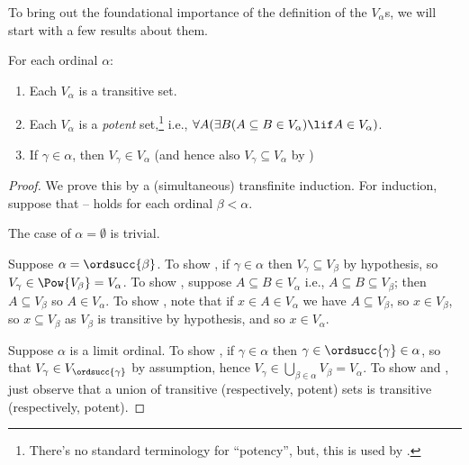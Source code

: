 \documentclass[../../../include/open-logic-section]{subfiles}
\begin{document}

To bring out the foundational importance of the definition of the
$V_\alpha$s, we will start with a few results about them.

\begin{lem}
For each ordinal $\alpha$:
\begin{enumerate}
	\item{} Each $V_\alpha$ is a transitive set.
	\item{} Each $V_\alpha$ is a
	\emph{potent} set,\footnote{There's no standard terminology for
	``potency'', but, this is used by  \citealt{ButtonLT1}.} i.e., $\forall A(\exists
	B(A \subseteq B \in V_\alpha) \lif A \in V_\alpha)$.
	\item{} If $\gamma \in \alpha$, then $V_\gamma
	\in V_\alpha$ (and hence also $V_\gamma \subseteq V_\alpha$ by
	)
\end{enumerate}
\end{lem}

\begin{proof}
We prove this by a (simultaneous) transfinite induction.  For
induction, suppose that -- holds
for each ordinal $\beta < \alpha$. 

The case of $\alpha = \emptyset$ is trivial. 

Suppose $\alpha = \ordsucc{\beta}$. To show , if
$\gamma \in \alpha$ then $V_\gamma \subseteq V_\beta$ by hypothesis,
so $V_\gamma \in \Pow{V_\beta} = V_\alpha$. To show
, suppose $A \subseteq B \in V_\alpha$ i.e., $A
\subseteq B \subseteq V_\beta$; then $A \subseteq V_\beta$ so $A \in
V_\alpha$. To show , note that if $x \in A \in
V_\alpha$ we have $A \subseteq V_\beta$, so $x \in V_\beta$, so $x
\subseteq V_\beta$ as $V_\beta$ is transitive by hypothesis, and so $x
\in V_\alpha$. 

Suppose $\alpha$ is  a limit ordinal. To show , if
$\gamma \in \alpha$ then $\gamma \in \ordsucc{\gamma} \in \alpha$, so
that $V_\gamma \in V_{\ordsucc{\gamma}}$ by assumption, hence
$V_\gamma \in \bigcup_{\beta \in \alpha} V_\beta = V_\alpha$. To show
 and , just observe that a
union of transitive (respectively, potent) sets is transitive
(respectively, potent). 
\end{proof}
\end{document}
